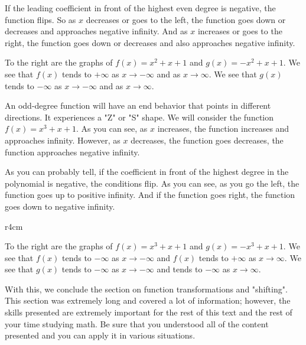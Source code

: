 \documentclass[../book.tex]{subfiles}
\begin{document}
If the leading coefficient in front of the highest even degree is negative, the function flips.  So as $x$ decreases or goes to the left, the function goes down or decreases and approaches negative infinity.  And as $x$ increases or goes to the right, the function goes down or decreases and also approaches negative infinity.

To the right are the graphs of $f(x)=x^2+x+1$ and $g(x)=-x^2+x+1$.  We see that $f(x)$ tends to $+\infty$ as $x\to-\infty$ and as $x\to\infty$.  We see that $g(x)$ tends to $-\infty$ as $x\to-\infty$ and as $x\to\infty$.

An odd-degree function will have an end behavior that points in different directions.  It experiences a "Z" or "S" shape.  We will consider the function $f(x)=x^3+x+1$.  As you can see, as $x$ increases, the function increases and approaches infinity.  However, as $x$ decreases, the function goes decreases, the function approaches negative infinity.  

As you can probably tell, if the coefficient in front of the highest degree in the polynomial is negative, the conditions flip.  As you can see, as you go the left, the function goes up to positive infinity.  And if the function goes right, the function goes down to negative infinity.  

\begin{wrapfigure}{r}{4cm}
    \centering
\end{wrapfigure}

To the right are the graphs of $f(x)=x^3+x+1$ and $g(x)=-x^3+x+1$.  We see that $f(x)$ tends to $-\infty$ as $x\to-\infty$ and $f(x)$ tends to $+\infty$ as $x\to\infty$.  We see that $g(x)$ tends to $-\infty$ as $x\to-\infty$ and tends to $-\infty$ as $x\to\infty$.

With this, we conclude the section on function transformations and "shifting".  This section was extremely long and covered a lot of information; however, the skills presented are extremely important for the rest of this text and the rest of your time studying math.  Be sure that you understood all of the content presented and you can apply it in various situations.
\end{document}

